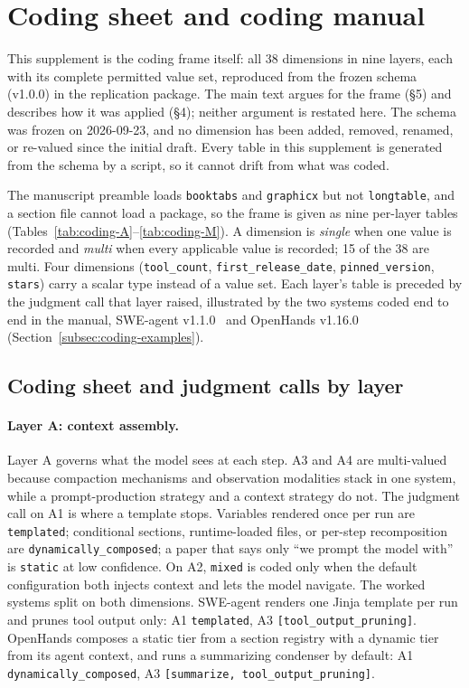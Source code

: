 \section{Coding sheet and coding manual}
\label{app:coding}

This supplement is the coding frame itself: all 38 dimensions in nine layers, each with its complete
permitted value set, reproduced from the frozen schema (v1.0.0) in the replication package. The main
text argues for the frame (\S5) and describes how it was applied (\S4);
neither argument is restated here. The schema was frozen on 2026-09-23, and no dimension has been added,
removed, renamed, or re-valued since the initial draft. Every table in this supplement is generated from
the schema by a script, so it cannot drift from what was coded.

The manuscript preamble loads \texttt{booktabs} and \texttt{graphicx} but not \texttt{longtable}, and a
section file cannot load a package, so the frame is given as nine per-layer tables
(Tables~\ref{tab:coding-A}--\ref{tab:coding-M}). A dimension is \emph{single} when one value is recorded
and \emph{multi} when every applicable value is recorded; 15 of the 38 are multi. Four dimensions
(\texttt{tool\_count}, \texttt{first\_release\_date}, \texttt{pinned\_version}, \texttt{stars}) carry a
scalar type instead of a value set. Each layer's table is preceded by the judgment call that layer
raised, illustrated by the two systems coded end to end in the manual,
SWE-agent v1.1.0~\citep{yang2024sweagent} and OpenHands v1.16.0~\citep{wang2024openhands}
(Section~\ref{subsec:coding-examples}).

\subsection{Coding sheet and judgment calls by layer}
\label{subsec:coding-sheet}

\paragraph{Layer A: context assembly.}\label{subsec:layer-a}
Layer A governs what the model sees at each step. A3 and A4 are multi-valued because compaction
mechanisms and observation modalities stack in one system, while a prompt-production strategy and a
context strategy do not. The judgment call on A1 is where a template stops. Variables rendered once per
run are \texttt{templated}; conditional sections, runtime-loaded files, or per-step recomposition are
\texttt{dynamically\_composed}; a paper that says only ``we prompt the model with'' is \texttt{static}
at low confidence. On A2, \texttt{mixed} is coded only when the default configuration both injects
context and lets the model navigate. The worked systems split on both dimensions. SWE-agent renders one
Jinja template per run and prunes tool output only: A1 \texttt{templated}, A3
\texttt{[tool\_output\_pruning]}. OpenHands composes a static tier from a section registry with a
dynamic tier from its agent context, and runs a summarizing condenser by default: A1
\texttt{dynamically\_composed}, A3 \texttt{[summarize, tool\_output\_pruning]}.

